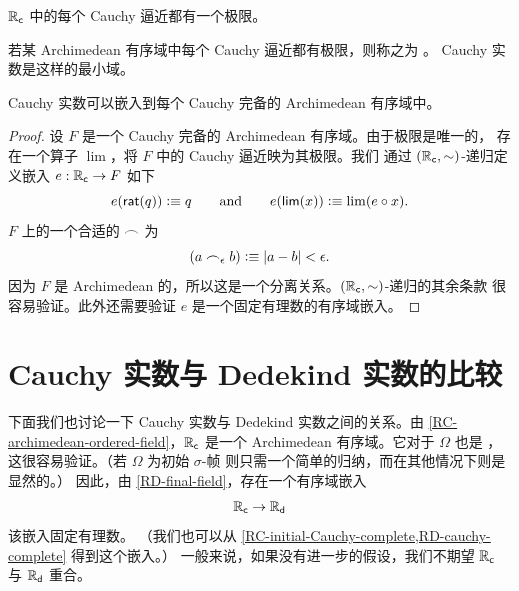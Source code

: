 \begin{thm}
  $\mathbb{R}_\mathsf{c}$ 中的每个 Cauchy 逼近都有一个极限。
\end{thm}

若某 Archimedean 有序域中每个 Cauchy 逼近都有极限，则称之为
。
%
%
%
Cauchy 实数是这样的最小域。

\begin{thm} \label{RC-initial-Cauchy-complete}
  Cauchy 实数可以嵌入到每个 Cauchy 完备的 Archimedean 有序域中。
\end{thm}

\begin{proof}
  设 $F$ 是一个 Cauchy 完备的 Archimedean 有序域。由于极限是唯一的，
  存在一个算子 $\lim$，将 $F$ 中的 Cauchy 逼近映为其极限。我们
  通过 $(\mathbb{R}_\mathsf{c}, {\mathord\sim})$-递归定义嵌入 $e : \mathbb{R}_\mathsf{c} \to F$ 如下
  \begin{equation*}
    e(\mathsf{rat}(q)) \vcentcolon\equiv q
    \qquad\text{and}\qquad
    e(\mathsf{lim}(x)) \vcentcolon\equiv \lim (e \circ x).
  \end{equation*}
  $F$ 上的一个合适的 $\frown$ 为
  \begin{equation*}
    (a \frown_\epsilon b) \vcentcolon\equiv |a - b| < \epsilon.
  \end{equation*}
  因为 $F$ 是 Archimedean 的，所以这是一个分离关系。$(\mathbb{R}_\mathsf{c}, {\mathord\sim})$-递归的其余条款
  很容易验证。此外还需要验证 $e$ 是一个固定有理数的有序域嵌入。
\end{proof}

%

\section{Cauchy 实数与 Dedekind 实数的比较}
\label{sec:comp-cauchy-dedek}

%
%

下面我们也讨论一下 Cauchy 实数与 Dedekind 实数之间的关系。由
\cref{RC-archimedean-ordered-field}，$\mathbb{R}_\mathsf{c}$ 是一个 Archimedean 有序域。它对于 $\Omega$ 也是
，这很容易验证。（若 $\Omega$ 为初始
$\sigma$-帧
%
%
则只需一个简单的归纳，而在其他情况下则是显然的。）
因此，由 \cref{RD-final-field}，存在一个有序域嵌入
%
\begin{equation*}
  \mathbb{R}_\mathsf{c} \to \mathbb{R}_\mathsf{d}
\end{equation*}
%
该嵌入固定有理数。
（我们也可以从 \cref{RC-initial-Cauchy-complete,RD-cauchy-complete} 得到这个嵌入。）
一般来说，如果没有进一步的假设，我们不期望 $\mathbb{R}_\mathsf{c}$ 与 $\mathbb{R}_\mathsf{d}$ 重合。

